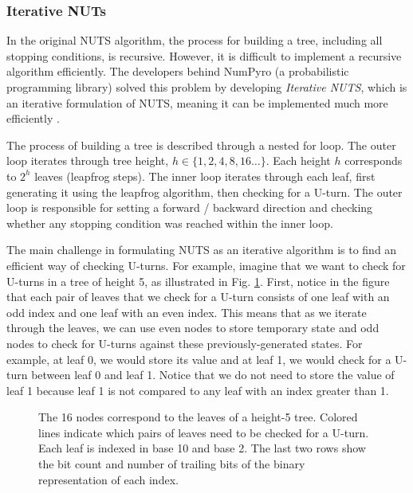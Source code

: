 \documentclass[12pt]{article}
\begin{document}
\subsubsection{Iterative NUTs}

In the original NUTS algorithm, the process for building a tree, including all stopping conditions, is recursive. However, it is difficult to implement a recursive algorithm efficiently. The developers behind NumPyro (a probabilistic programming library) solved this problem by developing \textit{Iterative NUTS}, which is an iterative formulation of NUTS, meaning it can be implemented much more efficiently \cite{numpyro}.

The process of building a tree is described through a nested for loop. The outer loop iterates through tree height, $h \in \{1, 2, 4, 8, 16 \ldots \}$. Each height $h$ corresponds to $2^h$ leaves (leapfrog steps). The inner loop iterates through each leaf, first generating it using the leapfrog algorithm, then checking for a U-turn. The outer loop is responsible for setting a forward / backward direction and checking whether any stopping condition was reached within the inner loop.

The main challenge in formulating NUTS as an iterative algorithm is to find an efficient way of checking U-turns. For example, imagine that we want to check for U-turns in a tree of height 5, as illustrated in Fig. \ref{fig_iterative_nuts_indexing}. First, notice in the figure that each pair of leaves that we check for a U-turn consists of one leaf with an odd index and one leaf with an even index. This means that as we iterate through the leaves, we can use even nodes to store temporary state and odd nodes to check for U-turns against these previously-generated states. For example, at leaf 0, we would store its value and at leaf 1, we would check for a U-turn between leaf 0 and leaf 1. Notice that we do not need to store the value of leaf 1 because leaf 1 is not compared to any leaf with an index greater than 1.

\begin{figure}[H]
\centering
{}
\caption{The 16 nodes correspond to the leaves of a height-5 tree. Colored lines indicate which pairs of leaves need to be checked for a U-turn. Each leaf is indexed in base 10 and base 2. The last two rows show the bit count and number of trailing bits of the binary representation of each index.}
\label{fig_iterative_nuts_indexing}
\end{figure}
\end{document}
